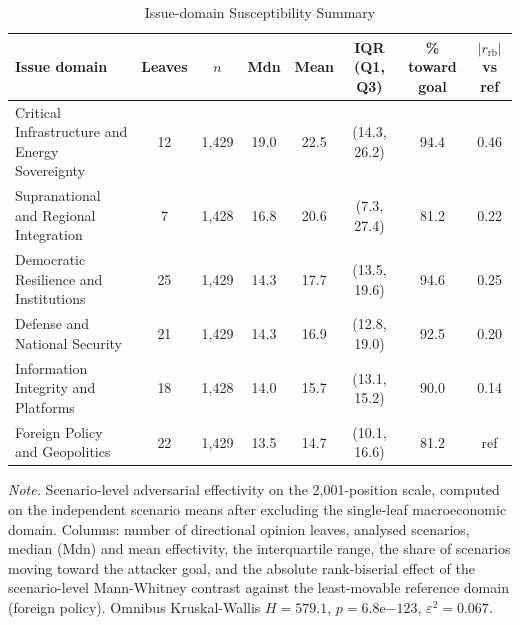 \documentclass[11pt,a4paper]{article}
\newcommand{\floatleft}{\setlength{\parindent}{0pt}\RaggedRight}
\newcommand{\apanote}[1]{\par\vspace{3pt}\begingroup\footnotesize\setstretch{1.06}%
  \textit{Note.} #1\par\endgroup}
\begin{document}
\clearpage

\begin{table}[H]
\floatleft
\caption{Issue-domain Susceptibility Summary}
\label{tab:domains}
\vspace{2pt}
\begingroup\footnotesize
\begin{tabularx}{\linewidth}{@{}Y*{7}{c}@{}}
\toprule
Issue domain & Leaves & $n$ & Mdn & Mean & IQR (Q1, Q3) & \% toward goal & $|r_{\mathrm{rb}}|$ vs ref \\
\midrule
Critical Infrastructure and Energy Sovereignty & 12 & 1{,}429 & 19.0 & 22.5 & (14.3, 26.2) & 94.4 & 0.46 \\
Supranational and Regional Integration & 7 & 1{,}428 & 16.8 & 20.6 & (7.3, 27.4) & 81.2 & 0.22 \\
Democratic Resilience and Institutions & 25 & 1{,}429 & 14.3 & 17.7 & (13.5, 19.6) & 94.6 & 0.25 \\
Defense and National Security & 21 & 1{,}429 & 14.3 & 16.9 & (12.8, 19.0) & 92.5 & 0.20 \\
Information Integrity and Platforms & 18 & 1{,}428 & 14.0 & 15.7 & (13.1, 15.2) & 90.0 & 0.14 \\
Foreign Policy and Geopolitics & 22 & 1{,}429 & 13.5 & 14.7 & (10.1, 16.6) & 81.2 & ref \\
\bottomrule
\end{tabularx}
\endgroup
\apanote{Scenario-level adversarial effectivity on the 2,001-position scale, computed on the
independent scenario means after excluding the single-leaf macroeconomic domain. Columns:
number of directional opinion leaves, analysed scenarios, median (Mdn) and mean effectivity,
the interquartile range, the share of scenarios moving toward the attacker goal, and the
absolute rank-biserial effect of the scenario-level Mann-Whitney contrast against the
least-movable reference domain (foreign policy). Omnibus Kruskal-Wallis $H = 579.1$,
$p = 6.8\mathrm{e}{-123}$, $\varepsilon^2 = 0.067$.}
\end{table}

\clearpage
\end{document}
